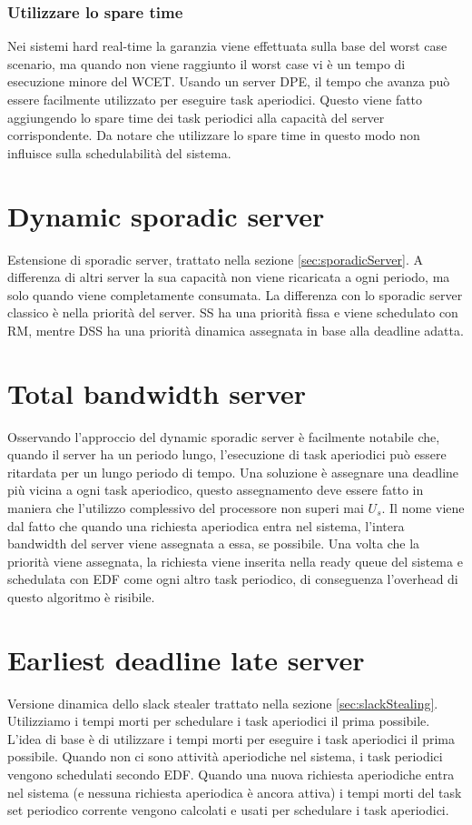 \documentclass[12pt,openany,onesided]{book}
\begin{document}
\subsubsection{Utilizzare lo spare time}
Nei sistemi hard real-time la garanzia viene effettuata sulla base del worst case scenario, ma quando non viene raggiunto il worst case vi è un tempo di esecuzione minore del WCET.
Usando un server DPE, il tempo che avanza può essere facilmente utilizzato per eseguire task aperiodici.
Questo viene fatto aggiungendo lo spare time dei task periodici alla capacità del server corrispondente.
Da notare che utilizzare lo spare time in questo modo non influisce sulla schedulabilità del sistema.
\section{Dynamic sporadic server}
\label{sec:dynamicSporadicServer}
Estensione di sporadic server, trattato nella sezione \ref{sec:sporadicServer}. A differenza di altri server la sua capacità non viene ricaricata a ogni periodo, ma solo quando viene completamente consumata.
La differenza con lo sporadic server classico è nella priorità del server. SS ha una priorità fissa e viene schedulato con RM, mentre DSS ha una priorità dinamica assegnata in base alla deadline adatta.
\section{Total bandwidth server}
\label{sec:totalBandwidthServer}
Osservando l'approccio del dynamic sporadic server è facilmente notabile che, quando il server ha un periodo lungo, l'esecuzione di task aperiodici può essere ritardata per un lungo periodo di tempo.
Una soluzione è assegnare una deadline più vicina a ogni task aperiodico, questo assegnamento deve essere fatto in maniera che l'utilizzo complessivo del processore non superi mai $U_s$.
Il nome viene dal fatto che quando una richiesta aperiodica entra nel sistema, l'intera bandwidth del server viene assegnata a essa, se possibile.
Una volta che la priorità viene assegnata, la richiesta viene inserita nella ready queue del sistema e schedulata con EDF come ogni altro task periodico, di conseguenza l'overhead di questo algoritmo è risibile.
\section{Earliest deadline late server}
\label{sec:earliestDeadlineLateServer}
Versione dinamica dello slack stealer trattato nella sezione \ref{sec:slackStealing}.
Utilizziamo i tempi morti per schedulare i task aperiodici il prima possibile.
L'idea di base è di utilizzare i tempi morti per eseguire i task aperiodici il prima possibile. Quando non ci sono attività aperiodiche nel sistema, i task periodici vengono schedulati
secondo EDF. Quando una nuova richiesta aperiodiche entra nel sistema (e nessuna richiesta aperiodica è ancora attiva) i tempi morti del task set periodico corrente vengono calcolati e usati per schedulare i task aperiodici.
\end{document}
